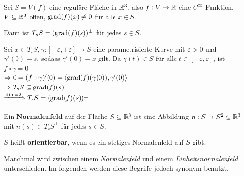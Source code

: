 \begin{bemerkung}%
    Sei $S=V(f)$ eine reguläre Fläche in $\mathbb{R}^3$, also 
    $f:V \rightarrow \mathbb{R}$ eine $C^\infty$-Funktion, $V \subseteq \mathbb{R}^3$
    offen, $\operatorname{grad}(f)(x) \neq 0$ für alle $x \in S$.

    Dann ist $T_s S = (\operatorname{grad}(f)(s))^\perp$ für jedes $s \in S$.
\end{bemerkung}
\begin{beweis}
    Sei $x \in T_s S, \gamma:[-\varepsilon, +\varepsilon] \rightarrow S$
    eine parametrisierte Kurve mit $\varepsilon > 0$ und $\gamma'(0) = s$,
    sodass $\gamma'(0) = x$ gilt. Da $\gamma(t) \in S$ für alle
    $t \in [-\varepsilon, \varepsilon]$, ist $f \circ \gamma = 0$\\
    $\Rightarrow 0 = (f \circ \gamma)'(0) = \langle \operatorname{grad}(f)(\gamma(0)), \gamma'(0) \rangle$\\
    $\Rightarrow T_s S \subseteq \operatorname{grad} (f)(s)^\perp$\\
    $\xRightarrow{\dim = 2} T_s S = (\operatorname{grad}(f)(s))^\perp$
\end{beweis}

\begin{definition}%
    \begin{defenum}
        \item Ein \textbf{Normalenfeld} auf der
              Fläche $S \subseteq \mathbb{R}^3$ ist eine Abbildung $n: S \rightarrow S^2 \subseteq \mathbb{R}^3$
              mit $n(s) \in T_s S^\perp$ für jedes $s \in S$.
        \item $S$ heißt \textbf{orientierbar},
              wenn es ein stetiges Normalenfeld auf $S$ gibt.
    \end{defenum}
\end{definition}

Manchmal wird zwischen einem \textit{Normalenfeld} und einem
\textit{Einheitsnormalenfeld} unterschieden.
Im folgenden werden diese Begriffe jedoch synonym benutzt.

